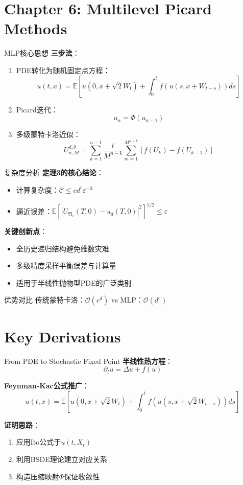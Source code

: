 \documentclass[aspectratio=169]{beamer}
\begin{document}
	\section{Chapter 6: Multilevel Picard Methods}
	\begin{frame}{MLP核心思想}
		\textbf{三步法}：
		\begin{enumerate}
			\item PDE转化为随机固定点方程：
			\[
			u(t,x) = \mathbb{E}\left[ u(0,x+\sqrt{2}W_t) + \int_0^t f(u(s,x+W_{t-s}))ds \right]
			\]
			\item Picard迭代：
			\[
			u_{n} = \Phi(u_{n-1})
			\]
			\item 多级蒙特卡洛近似：
			\[
			U_{n,M}^{d,\theta} = \sum_{k=1}^{n-1} \frac{t}{M^{n-k}} \sum_{m=1}^{M^{n-k}} [f(U_k) - f(U_{k-1})] 
			\]
		\end{enumerate}
	\end{frame}

	\begin{frame}{复杂度分析}
		\textbf{定理3的核心结论}：
		\begin{itemize}
			\item 计算复杂度：$\mathcal{C} \leq cd^c \varepsilon^{-3}$
			\item 逼近误差：$\mathbb{E}[|U_{\mathfrak{N}_\varepsilon}(T,0)-u_d(T,0)|^2]^{1/2} \leq \varepsilon$
		\end{itemize}

		\textbf{关键创新点}：
		\begin{itemize}
			\item 全历史递归结构避免维数灾难
			\item 多级精度采样平衡误差与计算量
			\item 适用于半线性抛物型PDE的广泛类别
		\end{itemize}

		\begin{exampleblock}{优势对比}
		传统蒙特卡洛：$\mathcal{O}(e^d)$ vs MLP：$\mathcal{O}(d^c)$
		\end{exampleblock}
	\end{frame}

	\section{Key Derivations}
	\begin{frame}{From PDE to Stochastic Fixed Point}
		\textbf{半线性热方程}：
		\[
		\partial_t u = \Delta u + f(u)
		\]

		\textbf{Feynman-Kac公式推广}：
		\[
		u(t,x) = \mathbb{E}\left[ u(0,x+\sqrt{2}W_t) + \int_0^t f(u(s,x+\sqrt{2}W_{t-s}))ds \right]
		\]

		\textbf{证明思路}：
		\begin{enumerate}
			\item 应用Ito公式于$u(t,X_t)$
			\item 利用BSDE理论建立对应关系
			\item 构造压缩映射$\Phi$保证收敛性
		\end{enumerate}
	\end{frame}
\end{document}
